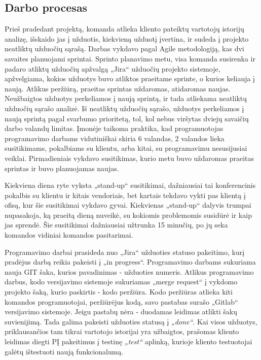 \subsection{Darbo procesas}
Prieš pradedant projektą, komanda atlieka kliento pateiktų vartotojų istorijų analizę, išskaido jas į užduotis, kiekvieną užduotį įvertina, ir sudeda į projekto neatliktų užduočių sąrašą.
Darbas vykdavo pagal Agile metodologiją, kas dvi savaites planuojami sprintai. Sprinto planavimo metu, visa komanda susirenka ir padaro atliktų užduočių apžvalgą „Jira“
užduočių projekto sistemoje, apžvelgiama, kokios užduotys buvo atliktos praeitame sprinte, o kurios keliauja į naują.
Atlikus peržiūrą, praeitas sprintas uždaromas, atidaromas naujas. Neužbaigtos užduotys perkeliamos į naują sprintą, ir tada atliekama neatliktų užduočių sąrašo analizė.
Iš neatliktų užduočių sąrašo, užduotys perkeliamos į naują sprintą pagal svarbumo prioritetą, tol, kol nebus viršytas dviejų savaičių darbo valandų limitas. Įmonėje taikoma praktika,
kad programuotojas programavimo darbams vidutiniškai skiria 6 valandas, 2 valandos lieka susitikimams, pokalbiams su klientu, arba kitai, su programavimu nesusijusiai veiklai.
Pirmadieniais vykdavo susitikimas, kurio metu buvo uždaromas praeitas sprintas ir buvo planuojamas naujas.

Kiekviena diena ryte vyksta „stand-up“ susitikimai, dažniausiai tai konferencinis pokalbis su klientu ir kitais vendoriais, bet kartais tekdavo vykti pas klientą į ofisą, kur šie
susitikimai vykdavo gyvai. Kiekvienas „stand-up“ dalyvis trumpai nupasakoja, ką praeitą dieną nuveikė, su kokiomis problemomis susidūrė ir kaip jas sprendė.
Šie susitikimai dažniausiai užtrunka 15 minučių, po jų seka komandos vidiniai komandos pasitarimai.

Programavimo darbai prasideda nuo „Jira“ užduoties statuso pakeitimo, kurį pradėjus darbą reikia pakeisti į „in progress“. Programavimo darbams sukuriama nauja GIT šaka, kurios pavadinimas
- užduoties numeris. Atlikus programavimo darbus, kodo versijavimo sistemoje
sukuriamas „merge request“ į vykdomo projekto šaką, kurio paskirtis - kodo peržiūra. Kodo peržiūras atlieka kiti komandos programuotojai, peržiūrėjus kodą, savo pastabas surašo
„Gitlab“ versijavimo sistemoje. Jeigu pastabų nėra - duodamas leidimas atlikti šakų suvienijimą. Tada galima pakeisti užduoties statusą į \textit{„done“}.
Kai visos užduotys, priklausančios tam tikrai vartotojo istorijai yra užbaigtos,
prašomas kliento leidimas diegti PĮ pakeitimus į testinę \textit{„test“} aplinką, kurioje kliento testuotojai galėtų ištestuoti naują funkcionalumą.

